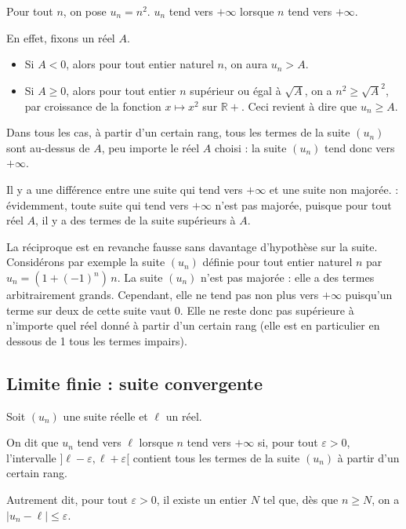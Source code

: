 \documentclass[11pt,fleqn]{book} %
\begin{document}
\begin{example} Pour tout $n$, on pose $u_n=n^2$. $u_n$ tend vers $+\infty$ lorsque $n$ tend vers $+\infty$. 

En effet, fixons un réel $A$.
\begin{itemize}
\item Si $A<0$, alors pour tout entier naturel $n$, on aura $u_n > A$.
\item Si $A \geqslant 0$, alors pour tout entier $n$ supérieur ou égal à $\sqrt{A}$, on a $n^2 \geqslant \sqrt{A}^2$, par croissance de la fonction $x \mapsto x^2$ sur $\mathbb{R}+$. Ceci revient à dire que $u_n \geqslant A$.
\end{itemize}
Dans tous les cas, à partir d'un certain rang, tous les termes de la suite $(u_n)$ sont au-dessus de $A$, peu importe le réel $A$ choisi : la suite $(u_n)$ tend donc vers $+\infty $.
\end{example}

Il y a une différence entre une suite qui tend vers $+\infty$ et une suite non majorée. : évidemment, toute suite qui tend vers $+\infty$ n'est pas majorée, puisque pour tout réel $A$, il y a des termes de la suite supérieurs à $A$.

La réciproque est en revanche fausse sans davantage d'hypothèse sur la suite. Considérons par exemple la suite $(u_n)$ définie pour tout entier naturel $n$ par $u_n=(1+(-1)^n) \, n$. La suite $(u_n)$ n'est pas majorée : elle a des termes arbitrairement grands. Cependant, elle ne tend pas non plus vers $+\infty$ puisqu'un terme sur deux de cette suite vaut 0. Elle ne reste donc pas supérieure à n'importe quel réel donné à partir d'un certain rang (elle est en particulier en dessous de 1 tous les termes impairs).

\subsection{Limite finie : suite convergente}

\begin{definition}Soit $(u_n)$ une suite réelle et $\ell$ un réel. 

On dit que $u_n$ tend vers $\ell$ lorsque $n$ tend vers $+\infty$ si, pour tout $\varepsilon >0$, l'intervalle $] \ell- \varepsilon, \ell+\varepsilon [$ contient tous les termes de la suite $(u_n)$ à partir d'un certain rang.

Autrement dit, pour tout $\varepsilon >0$, il existe un entier $N$ tel que, dès que $n\geqslant N$, on a $|u_n- \ell | \leqslant \varepsilon$.\end{definition}
\end{document}
